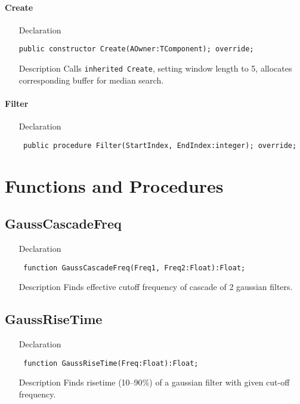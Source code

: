 \documentclass[12pt,a4paper,oneside]{report}
\newcommand{\declarationitem}[1]{{\addfontfeatures{FakeBold=1.3} #1}}
\newcommand{\descriptiontitle}[1]{{\addfontfeatures{FakeSlant}#1}}
\newcommand{\code}[1]{\texttt{#1}}
\begin{document}
\paragraph{Create}\hspace*{\fill}
\label{lmfilters.TMedianFilter-Create}
\begin{itemize}\item[\declarationitem{Declaration}\hfill]
	\begin{flushleft}
		\code{public constructor Create(AOwner:TComponent); override;}
	\end{flushleft}
\item[\descriptiontitle{Description}] Calls \code{inherited Create}, setting window length to 5, allocates corresponding buffer for median search.
\end{itemize}
\paragraph{Filter}\hspace*{\fill}
\label{lmfilters.TMedianFilter-filter}
\begin{itemize}\item[\declarationitem{Declaration}\hfill]
	\begin{flushleft}
		\code{
			public procedure Filter(StartIndex, EndIndex:integer); override;}
	\end{flushleft}
\end{itemize}
\section{Functions and Procedures}
\subsection{GaussCascadeFreq}
\label{lmfilters-GaussCascadeFreq}
\begin{itemize}\item[\declarationitem{Declaration}\hfill]
	\begin{flushleft}
		\code{
			function GaussCascadeFreq(Freq1, Freq2:Float):Float;}
	\end{flushleft}
	\item[\descriptiontitle{Description}]
	Finds effective cutoff frequency of cascade of 2 gaussian filters.
\end{itemize}
\subsection{GaussRiseTime}
\label{lmfilters-GaussRiseTime}
\begin{itemize}\item[\declarationitem{Declaration}\hfill]
	\begin{flushleft}
		\code{
			function GaussRiseTime(Freq:Float):Float;}
	\end{flushleft}
	\item[\descriptiontitle{Description}]
	Finds risetime (10--90{\%}) of a gaussian filter with given cut{-}off frequency.
\end{itemize}
\end{document}

